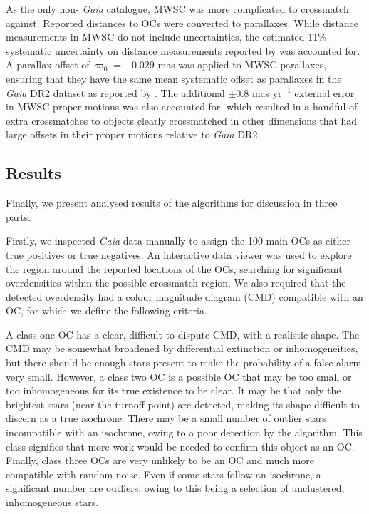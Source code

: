 As the only non- \emph{Gaia}  catalogue, MWSC was more complicated to crossmatch against. Reported distances to OCs were converted to parallaxes. While distance measurements in MWSC do not include uncertainties, the estimated 11\% systematic uncertainty on distance measurements reported by \cite{kharchenko_global_2013} was accounted for. A parallax offset of $\varpi_0 = -0.029$ mas was applied to MWSC parallaxes, ensuring that they have the same mean systematic offset as parallaxes in the \emph{Gaia} DR2 dataset as reported by \cite{lindegren_gaia_2018}. The additional $\pm$0.8 mas yr$^{-1}$ external error in MWSC proper motions was also accounted for, which resulted in a handful of extra crossmatches to objects clearly crossmatched in other dimensions that had large offsets in their proper motions relative to \emph{Gaia} DR2.


\subsection{Results}\label{c2:sec:analysis_results}

Finally, we present analysed results of the algorithms for discussion in three parts.

Firstly, we inspected \emph{Gaia} data manually to assign the 100 main OCs as either true positives or true negatives. An interactive data viewer was used to explore the region around the reported locations of the OCs, searching for significant overdensities within the possible crossmatch region. We also required that the detected overdensity had a colour magnitude diagram (CMD) compatible with an OC, for which we define the following criteria.

A class one OC has a clear, difficult to dispute CMD, with a realistic shape. The CMD may be somewhat broadened by differential extinction or inhomogeneities, but there should be enough stars present to make the probability of a false alarm very small. However, a class two OC is a possible OC that may be too small or too inhomogeneous for its true existence to be clear. It may be that only the brightest stars (near the turnoff point) are detected, making its shape difficult to discern as a true isochrone. There may be a small number of outlier stars incompatible with an isochrone, owing to a poor detection by the algorithm. This class signifies that more work would be needed to confirm this object as an OC. Finally, class three OCs are very unlikely to be an OC and much more compatible with random noise. Even if some stars follow an isochrone, a significant number are outliers, owing to this being a selection of unclustered, inhomogeneous stars.

